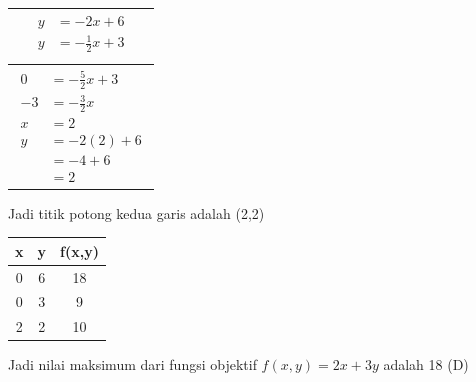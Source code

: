 \documentclass{report}
\begin{document}
\begin{enumerate}
\begin{center}
\begin{tabular}{c}
{\begin{align*}
				y&=-2x+6\\
				y&=-\frac{1}{2}x+3\\
			\end{align*}
		} \\
		\hline
		\parbox{3cm}{
			\begin{align*}
				0&=-\frac{5}{2}x+3\\
				-3&=-\frac{3}{2}x\\
				x&=2\\
				y&=-2(2)+6\\
				&=-4+6\\
				&=2
			\end{align*}
		} \\
	\end{tabular}
	\end{center}
Jadi titik potong kedua garis adalah  (2,2)\\
\begin{center}
	\begin{tabular}{|c|c|c|}
		\hline
		x&y&f(x,y)\\
		\hline
		0&6&18\\
		\hline
		0&3&9\\
		\hline
		2&2&10\\
		\hline
	\end{tabular}
\end{center}
Jadi nilai maksimum dari fungsi objektif $f(x,y)=2x+3y$ adalah 18 (D)


\end{enumerate}
\end{document}
